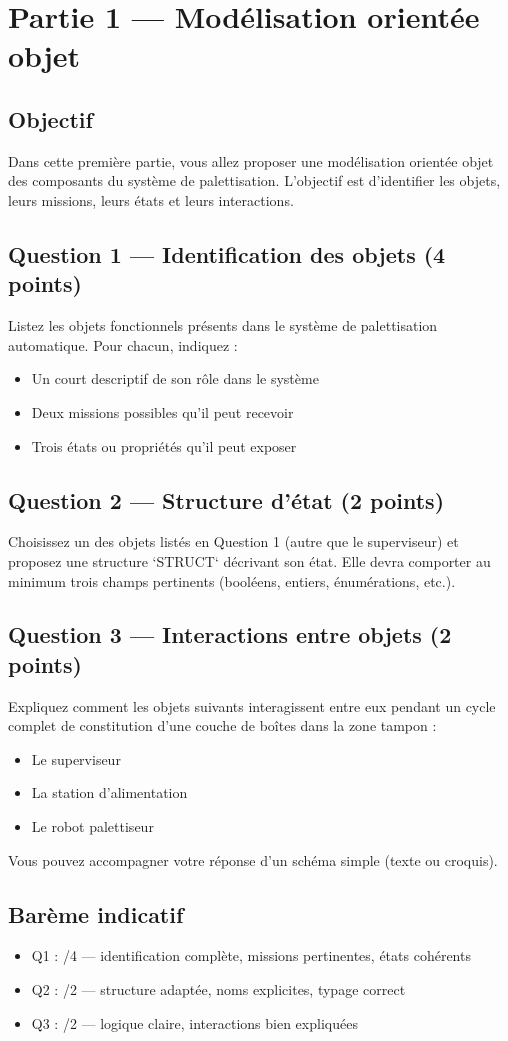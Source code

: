 \section*{Partie 1 — Modélisation orientée objet}
\subsection*{Objectif}
Dans cette première partie, vous allez proposer une modélisation orientée objet des composants du système de palettisation. L’objectif est d’identifier les objets, leurs missions, leurs états et leurs interactions.

\subsection*{Question 1 — Identification des objets (4 points)}
Listez les objets fonctionnels présents dans le système de palettisation automatique. Pour chacun, indiquez :
\begin{itemize}
    \item Un court descriptif de son rôle dans le système
    \item Deux missions possibles qu’il peut recevoir
    \item Trois états ou propriétés qu’il peut exposer
\end{itemize}

\subsection*{Question 2 — Structure d'état (2 points)}
Choisissez un des objets listés en Question 1 (autre que le superviseur) et proposez une structure `STRUCT` décrivant son état. Elle devra comporter au minimum trois champs pertinents (booléens, entiers, énumérations, etc.).

\subsection*{Question 3 — Interactions entre objets (2 points)}
Expliquez comment les objets suivants interagissent entre eux pendant un cycle complet de constitution d'une couche de boîtes dans la zone tampon :
\begin{itemize}
    \item Le superviseur
    \item La station d’alimentation
    \item Le robot palettiseur
\end{itemize}
Vous pouvez accompagner votre réponse d’un schéma simple (texte ou croquis).

\subsection*{Barème indicatif}
\begin{itemize}
    \item Q1 : /4 — identification complète, missions pertinentes, états cohérents
    \item Q2 : /2 — structure adaptée, noms explicites, typage correct
    \item Q3 : /2 — logique claire, interactions bien expliquées
\end{itemize}
